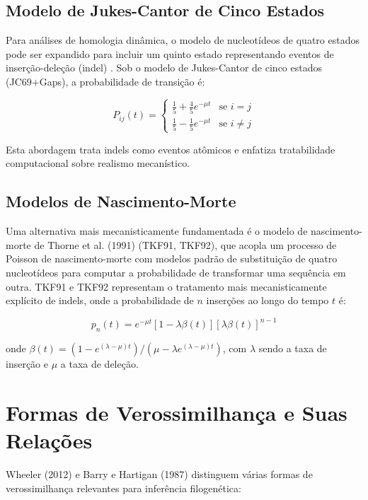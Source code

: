 \subsection{Modelo de Jukes-Cantor de Cinco Estados}

Para análises de homologia dinâmica, o modelo de nucleotídeos de quatro estados pode ser expandido para incluir um quinto estado representando eventos de inserção-deleção (indel) \parencite{wheeler2006,mcguire2001}. Sob o modelo de Jukes-Cantor de cinco estados (JC69+Gaps), a probabilidade de transição é:

$$P_{ij}(t) = \begin{cases} \frac{1}{5} + \frac{4}{5} e^{-\mu t} & \text{se } i = j \\ \frac{1}{5} - \frac{1}{5} e^{-\mu t} & \text{se } i \neq j \end{cases}$$

Esta abordagem trata indels como eventos atômicos e enfatiza tratabilidade computacional sobre realismo mecanístico.

\subsection{Modelos de Nascimento-Morte}

Uma alternativa mais mecanisticamente fundamentada é o modelo de nascimento-morte de Thorne et al. (1991) (TKF91, TKF92), que acopla um processo de Poisson de nascimento-morte com modelos padrão de substituição de quatro nucleotídeos para computar a probabilidade de transformar uma sequência em outra. TKF91 e TKF92 representam o tratamento mais mecanisticamente explícito de indels, onde a probabilidade de $n$ inserções ao longo do tempo $t$ é:

$$p_n(t) = e^{-\mu t}\left[1 - \lambda\beta(t)\right] \left[\lambda\beta(t)\right]^{n-1}$$

onde $\beta(t) = (1 - e^{(\lambda-\mu)t})/(\mu - \lambda e^{(\lambda-\mu)t})$, com $\lambda$ sendo a taxa de inserção e $\mu$ a taxa de deleção.

\section{Formas de Verossimilhança e Suas Relações}

Wheeler (2012) e Barry e Hartigan (1987) distinguem várias formas de verossimilhança relevantes para inferência filogenética:

